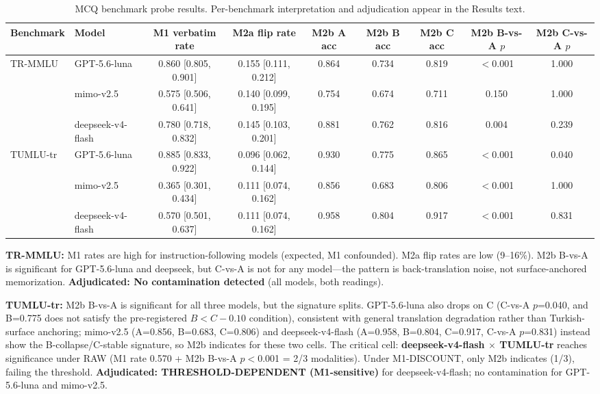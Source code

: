 \documentclass[letterpaper]{article}
\begin{document}
\begin{table}[t]
\centering
\begin{adjustbox}{max width=\textwidth}
\begin{tabular}{llccccccc}
\toprule
\textbf{Benchmark} & \textbf{Model} & \textbf{M1 verbatim rate} & \textbf{M2a flip rate} & \textbf{M2b A acc} & \textbf{M2b B acc} & \textbf{M2b C acc} & \textbf{M2b B-vs-A $p$} & \textbf{M2b C-vs-A $p$} \\
\midrule
\multirow{3}{*}{TR-MMLU} & GPT-5.6-luna & 0.860 [0.805, 0.901] & 0.155 [0.111, 0.212] & 0.864 & 0.734 & 0.819 & $<$0.001 & 1.000 \\
 & mimo-v2.5 & 0.575 [0.506, 0.641] & 0.140 [0.099, 0.195] & 0.754 & 0.674 & 0.711 & 0.150 & 1.000 \\
 & deepseek-v4-flash & 0.780 [0.718, 0.832] & 0.145 [0.103, 0.201] & 0.881 & 0.762 & 0.816 & 0.004 & 0.239 \\
\midrule
\multirow{3}{*}{TUMLU-tr} & GPT-5.6-luna & 0.885 [0.833, 0.922] & 0.096 [0.062, 0.144] & 0.930 & 0.775 & 0.865 & $<$0.001 & 0.040 \\
 & mimo-v2.5 & 0.365 [0.301, 0.434] & 0.111 [0.074, 0.162] & 0.856 & 0.683 & 0.806 & $<$0.001 & 1.000 \\
 & deepseek-v4-flash & 0.570 [0.501, 0.637] & 0.111 [0.074, 0.162] & 0.958 & 0.804 & 0.917 & $<$0.001 & 0.831 \\
\bottomrule
\end{tabular}%
\end{adjustbox}
\caption{MCQ benchmark probe results. Per-benchmark interpretation and adjudication appear in the Results text.}
\label{tab:mcq}
\end{table}

\textbf{TR-MMLU:} M1 rates are high for instruction-following models (expected, M1 confounded). M2a flip rates are low (9--16\%). M2b B-vs-A is significant for GPT-5.6-luna and deepseek, but C-vs-A is not for any model---the pattern is back-translation noise, not surface-anchored memorization. \textbf{Adjudicated: No contamination detected} (all models, both readings).

\textbf{TUMLU-tr:} M2b B-vs-A is significant for all three models, but the signature splits. GPT-5.6-luna also drops on C (C-vs-A $p$=0.040, and B=0.775 does not satisfy the pre-registered $B<C-0.10$ condition), consistent with general translation degradation rather than Turkish-surface anchoring; mimo-v2.5 (A=0.856, B=0.683, C=0.806) and deepseek-v4-flash (A=0.958, B=0.804, C=0.917, C-vs-A $p$=0.831) instead show the B-collapse/C-stable signature, so M2b indicates for these two cells. The critical cell: \textbf{deepseek-v4-flash $\times$ TUMLU-tr} reaches significance under RAW (M1 rate 0.570 + M2b B-vs-A $p<$0.001 = 2/3 modalities). Under M1-DISCOUNT, only M2b indicates (1/3), failing the threshold. \textbf{Adjudicated: THRESHOLD-DEPENDENT (M1-sensitive)} for deepseek-v4-flash; no contamination for GPT-5.6-luna and mimo-v2.5.
\end{document}
